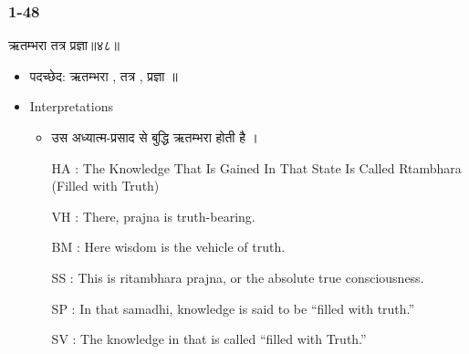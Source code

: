 \begin{frame}[fragile]\frametitle{1-48}
\begin{sanskrit}
ऋतम्भरा तत्र प्रज्ञा॥४८॥
\end{sanskrit}

	\begin{itemize}
	\item पदच्छेद: ऋतम्भरा , तत्र , प्रज्ञा ॥
	\item Interpretations
		\begin{itemize}
		\item उस अध्यात्म-प्रसाद से बुद्धि ऋतम्भरा होती है ।
		\item [HA]: The Knowledge That Is Gained In That State Is Called Rtambhara (Filled with Truth)
		\item [VH]: There, prajna is truth-bearing.
		\item [BM]: Here wisdom is the vehicle of truth.
		\item [SS]: This is ritambhara prajna, or the absolute true consciousness.
		\item [SP]: In that samadhi, knowledge is said to be “filled with truth.”
		\item [SV]: The knowledge in that is called “filled with Truth.” 
		\end{itemize}
	\end{itemize}
	
\end{frame}



